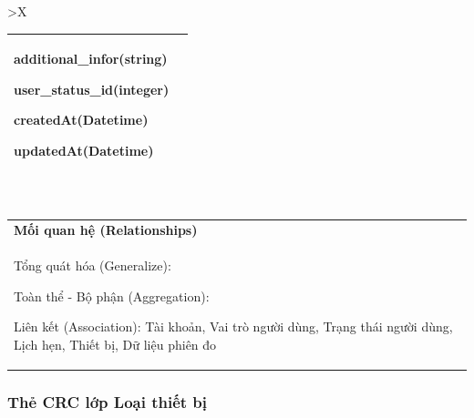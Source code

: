 \begin{xltabular}{\textwidth}{
		>{\centering\arraybackslash}X
	}
\begin{tabularx}{0.9\textwidth}{|X|X|}
		additional\_infor(string)

		user\_status\_id(integer)

		createdAt(Datetime)

		updatedAt(Datetime)
		\\ \hline
	\end{tabularx}
	\\
	\begin{tabularx}{0.9\textwidth}{|X|}
		\hline
		\textbf{Mối quan hệ (Relationships)} \\
		Tổng quát hóa (Generalize):

		Toàn thể - Bộ phận (Aggregation):

		Liên kết (Association): Tài khoản, Vai trò người dùng, Trạng thái người dùng, Lịch hẹn, Thiết bị, Dữ liệu phiên đo
		\\
		\hline
	\end{tabularx}
\end{xltabular}

\subsubsection{Thẻ CRC lớp Loại thiết bị}

